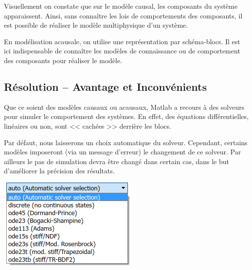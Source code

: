 \documentclass[10pt,fleqn]{article} %
\begin{document}
Visuellement on constate que sur le modèle causal, les composants du système apparaissent. Ainsi, sans connaître les lois de comportements des composants, il est possible de réaliser le modèle multiphysique d'un système.

En modélisation acausale, on utilise une représentation par schéma-blocs. Il est ici indispensable de connaître les modèles de connaissance ou de comportement des composants pour réaliser le modèle.

\subsection{Résolution -- Avantage et Inconvénients}

\noindent
\begin{minipage}[c]{.6\linewidth}
Que ce soient des modèles causaux ou acausaux, Matlab a recours à des solveurs pour simuler le comportement des systèmes. En effet, des équations différentielles, linéaires ou non, sont << cachées >> derrière les blocs.  

Par défaut, nous laisserons un choix automatique du solveur. Cependant, certains modèles imposeront (via un message d'erreur) le changement de ce solveur. Par ailleurs le pas de simulation devra être changé dans certain cas, dans le but d'améliorer la précision des résultats.
\end{minipage} \hfill
\begin{minipage}[c]{.35\linewidth}
\begin{center}
\includegraphics[width=\linewidth]{images/solveur}
\end{center}
\end{minipage}
\end{document}
